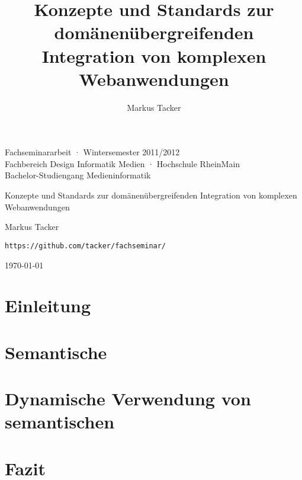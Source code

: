 \documentclass[10pt,a4paper]{article}
\begin{document}
\author{Markus Tacker}
\title{Konzepte und Standards zur domänenübergreifenden Integration von komplexen Webanwendungen}

\begin{center}

\begin{small}Fachseminararbeit · Wintersemester 2011/2012\\Fachbereich Design Informatik Medien · Hochschule RheinMain\\Bachelor-Studiengang Medieninformatik\end{small}

\bigskip

\begin{huge}Konzepte und Standards 
\medskip
zur domänenübergreifenden Integration
\medskip
von komplexen Webanwendungen\end{huge}

\bigskip

\begin{large}Markus Tacker\end{large}

\begin{small}\texttt{https://github.com/tacker/fachseminar/}\end{small}

\today

\end{center}



\pagebreak

\tableofcontents

\section{Einleitung}
\label{l:einleitung}


\section{Semantische \ws}
\label{l:sem-web-ser}


\section{Dynamische Verwendung von semantischen \ws}
\label{l:loesungen}


\section{Fazit}
\label{l:fazit}
% 

\pagebreak




\end{document}
